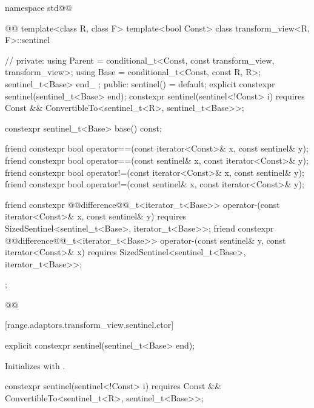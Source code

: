 \begin{codeblock}
namespace std@@ { @@
  template<class R, class F>
  template<bool Const>
  class transform_view<R, F>::sentinel { // \expos
  private:
    using Parent = conditional_t<Const, const transform_view, transform_view>;
    using Base = conditional_t<Const, const R, R>;
    sentinel_t<Base> end_ {};
  public:
    sentinel() = default;
    explicit constexpr sentinel(sentinel_t<Base> end);
    constexpr sentinel(sentinel<!Const> i)
      requires Const && ConvertibleTo<sentinel_t<R>, sentinel_t<Base>>;

    constexpr sentinel_t<Base> base() const;

    friend constexpr bool operator==(const iterator<Const>& x, const sentinel& y);
    friend constexpr bool operator==(const sentinel& x, const iterator<Const>& y);
    friend constexpr bool operator!=(const iterator<Const>& x, const sentinel& y);
    friend constexpr bool operator!=(const sentinel& x, const iterator<Const>& y);

    friend constexpr @@difference@@_t<iterator_t<Base>>
      operator-(const iterator<Const>& x, const sentinel& y)
        requires SizedSentinel<sentinel_t<Base>, iterator_t<Base>>;
    friend constexpr @@difference@@_t<iterator_t<Base>>
      operator-(const sentinel& y, const iterator<Const>& x)
        requires SizedSentinel<sentinel_t<Base>, iterator_t<Base>>;
  };
}@\oldtxt{\}}@
\end{codeblock}

[range.adaptors.transform_view.sentinel.ctor]{}

\begin{itemdecl}
explicit constexpr sentinel(sentinel_t<Base> end);
\end{itemdecl}

\begin{itemdescr}
\pnum
\effects Initializes  with .
\end{itemdescr}

\begin{itemdecl}
constexpr sentinel(sentinel<!Const> i)
  requires Const && ConvertibleTo<sentinel_t<R>, sentinel_t<Base>>;
\end{itemdecl}

